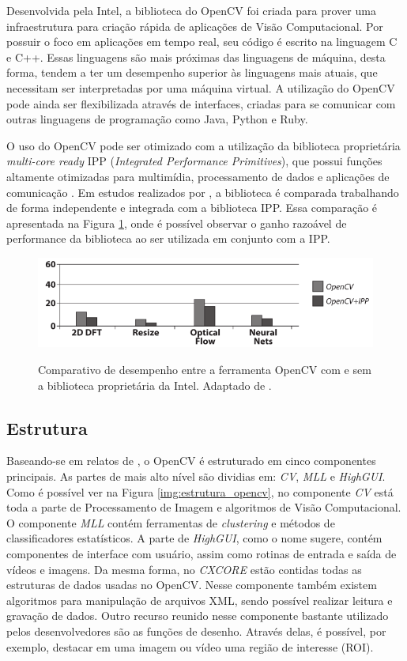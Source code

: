 Desenvolvida pela Intel, a biblioteca do OpenCV foi criada para prover uma infraestrutura para criação rápida de aplicações de Visão Computacional. Por possuir o foco em aplicações em tempo real, seu código é escrito na linguagem C e C++. Essas linguagens são mais próximas das linguagens de máquina, desta forma, tendem a ter um desempenho superior às linguagens mais atuais, que necessitam ser interpretadas por uma máquina virtual. A utilização do OpenCV pode ainda ser flexibilizada através de interfaces, criadas para se comunicar com outras linguagens de programação como Java, Python e Ruby.

O uso do OpenCV pode ser otimizado com a utilização da biblioteca proprietária \textit{multi-core ready} IPP (\textit{Integrated Performance Primitives}), que possui funções altamente otimizadas para multimídia, processamento de dados e aplicações de comunicação \cite{IPP}. Em estudos realizados por , a biblioteca é comparada trabalhando de forma independente e integrada com a biblioteca IPP. Essa comparação é apresentada na Figura \ref{img:comparativo}, onde é possível observar o ganho razoável de performance da biblioteca ao ser utilizada em conjunto com a IPP.

\begin{figure}[H]
    \centering
    {\includegraphics[scale=0.5]{figuras/comparativo}}
    \caption{Comparativo de desempenho entre a ferramenta OpenCV com e sem a biblioteca proprietária da Intel. Adaptado de \cite{BRADSKI}.}
    \label{img:comparativo}
\end{figure}

\subsection{Estrutura}

Baseando-se em relatos de , o OpenCV é estruturado em cinco componentes principais. As partes de mais alto nível são dividias em: \textit{CV}, \textit{MLL} e \textit{HighGUI}. Como é possível ver na Figura \ref{img:estrutura_opencv}, no componente \textit{CV} está toda a parte de Processamento de Imagem e algoritmos de Visão Computacional. O componente \textit{MLL} contém ferramentas de \textit{clustering} e métodos de classificadores estatísticos. A parte de \textit{HighGUI}, como o nome sugere, contém componentes de interface com usuário, assim como rotinas de entrada e saída de vídeos e imagens. Da mesma forma, no \textit{CXCORE} estão contidas todas as estruturas de dados usadas no OpenCV. Nesse componente também existem algoritmos para manipulação de arquivos XML, sendo possível realizar leitura e gravação de dados. Outro recurso reunido nesse componente bastante utilizado pelos desenvolvedores são as funções de desenho. Através delas, é possível, por exemplo, destacar em uma imagem ou vídeo uma região de interesse (ROI).

